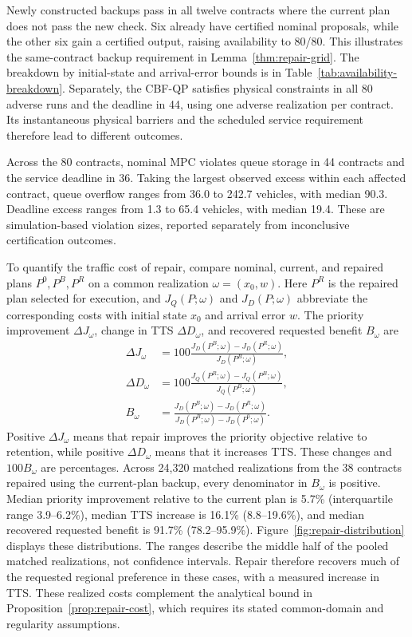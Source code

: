 Newly constructed backups pass in all twelve contracts where the current
plan does not pass the new check. Six already have certified nominal
proposals, while the other six gain a certified output, raising availability
to 80/80. This illustrates the same-contract backup requirement in
Lemma~\ref{thm:repair-grid}. The breakdown by initial-state and arrival-error
bounds is in Table~\ref{tab:availability-breakdown}.
Separately, the CBF-QP satisfies physical constraints in all
80 adverse runs and the deadline in 44, using one adverse realization per
contract. Its instantaneous physical barriers and the scheduled service
requirement therefore lead to different outcomes.

Across the 80 contracts, nominal MPC violates queue storage in 44
contracts and the service deadline in 36. Taking the largest observed
excess within each affected contract, queue overflow ranges from 36.0 to
242.7 vehicles, with median 90.3. Deadline excess ranges from 1.3 to
65.4 vehicles, with median 19.4. These are simulation-based violation sizes,
reported separately from inconclusive certification outcomes.

To quantify the traffic cost of repair, compare nominal, current, and
repaired plans $P^0,P^B,P^R$ on a common realization $\omega=(x_0,w)$.
Here $P^R$ is the repaired plan selected for execution, and
$J_Q(P;\omega)$ and $J_D(P;\omega)$ abbreviate the corresponding costs
with initial state $x_0$ and arrival error $w$. The priority
improvement $\Delta J_\omega$, change in TTS
$\Delta D_\omega$, and recovered requested benefit $B_\omega$ are
\begin{equation}
\begin{aligned}
\Delta J_\omega&=100\frac{J_D(P^B;\omega)-J_D(P^R;\omega)}{J_D(P^B;\omega)},\\
\Delta D_\omega&=100\frac{J_Q(P^R;\omega)-J_Q(P^B;\omega)}{J_Q(P^B;\omega)},\\
B_\omega&=\frac{J_D(P^B;\omega)-J_D(P^R;\omega)}{J_D(P^B;\omega)-J_D(P^0;\omega)}.
\end{aligned}
\label{eq:benchmark-repair-metrics}
\end{equation}
Positive $\Delta J_\omega$ means that repair improves the priority
objective relative to retention, while positive $\Delta D_\omega$ means
that it increases TTS. These changes and $100B_\omega$ are percentages.
Across 24,320 matched realizations from the 38 contracts repaired using
the current-plan backup, every denominator in $B_\omega$ is positive.
Median priority improvement relative to the current plan is 5.7\%
(interquartile range 3.9--6.2\%), median TTS increase is 16.1\%
(8.8--19.6\%), and median recovered requested benefit is 91.7\%
(78.2--95.9\%). Figure~\ref{fig:repair-distribution} displays these distributions.
The ranges describe the middle half of the pooled matched realizations,
not confidence intervals. Repair therefore recovers much of
the requested regional preference in these cases, with a measured increase
in TTS. These realized costs complement the analytical
bound in Proposition~\ref{prop:repair-cost}, which requires its stated
common-domain and regularity assumptions.


